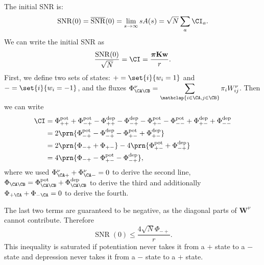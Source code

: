 \documentclass[12pt]{article}
\newcommand{\eqm}{\pi}
\newcommand{\eq}{\boldsymbol{\eqm}}
\newcommand{\wm}{w}
\newcommand{\w}{\mathbf{\wm}}
\newcommand{\Wm}{W}
\newcommand{\W}{\mathbf{\Wm}}
\newcommand{\encm}{K}
\newcommand{\enc}{\mathbf{\encm}}
\newcommand{\Fm}{\Phi}
\newcommand{\pot}{^{\text{pot}}}
\newcommand{\dep}{^{\text{dep}}}
\DeclareMathOperator{\SNR}{SNR}
\DeclareMathOperator{\snr}{SNR}
\newcommand{\snrb}{\overline{\snr}}
\begin{document}
The initial SNR is:
%
\begin{equation}\label{eq:initdef}
  \snr(0) = \snrb(0) = \lim_{s\to\infty} sA(s)
      = \sqrt{N} \sum_a \CI_a.
\end{equation}
%
We can write the initial SNR as
%
\begin{equation*}
  \frac{\SNR(0)}{\sqrt{N}} = \CI = \frac{\eq \enc \w}{r}.
\end{equation*}
%
First, we define two sets of states: \( + = \set{i}{\wm_i = 1} \) and \( - = \set{i}{\wm_i = - 1} \), and the fluxes \( \Fm^\nu_{\CA \CB} = \displaystyle\sum_{\mathclap{i \in \CA, j \in \CB}} \eqm_i \Wm^\nu_{ij} \).
Then we can write
%
\begin{equation*}
\begin{aligned}
  \CI &= \Fm\pot_{++} + \Fm\pot_{-+} - \Fm\dep_{++} - \Fm\dep_{-+} - \Fm\pot_{+-} - \Fm\pot_{--} + \Fm\dep_{+-} + \Fm\dep_{--} \\
      &= 2\prn{\Fm\pot_{-+} - \Fm\dep_{-+} - \Fm\pot_{+-} + \Fm\dep_{+-}} \\
      &= 2\prn{\Fm_{-+} + \Fm_{+-}} - 4\prn{\Fm\pot_{+-} + \Fm\dep_{-+}} \\
      &= 4\prn{\Fm_{-+} - \Fm\pot_{+-} - \Fm\dep_{-+}}, \\
\end{aligned}
\end{equation*}
%
where we used \( \Fm^\nu_{\CA+} + \Fm^\nu_{\CA-} = 0 \) to derive the second line, \( \Fm_{\CA\CB} = \Fm\pot_{\CA\CB} + \Fm\dep_{\CA\CB} \) to derive the third and additionally \( \Fm_{+\CA} + \Fm_{-\CA} = 0 \) to derive the fourth.

The last two terms are guaranteed to be negative, as the diagonal parts of \(\W^\nu \) cannot contribute.
Therefore
%
\begin{equation}\label{eq:initfluxineq}
  \SNR(0) \leq \frac{4\sqrt{N}\Fm_{-+}}{r}.
\end{equation}
%
This inequality is saturated if potentiation never takes it from a \(+\) state to a \(-\) state and depression never takes it from a \(-\) state to a \(+\) state.
\end{document}
